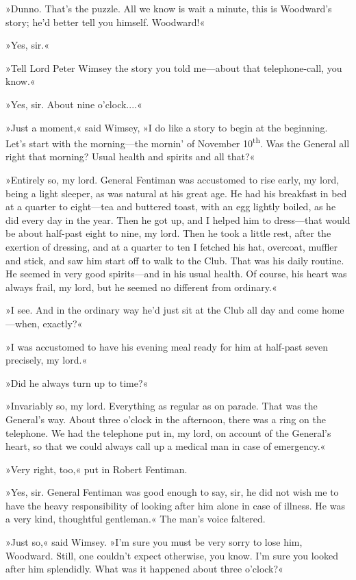 »Dunno. That's the puzzle. All we know is \textellipsis  wait a minute, this is Woodward's story; he'd better tell you himself. Woodward!«

»Yes, sir.«

»Tell Lord Peter Wimsey the story you told me—about that telephone-call, you know.«

»Yes, sir. About nine o'clock....«

»Just a moment,« said Wimsey, »I do like a story to begin at the beginning. Let's start with the morning—the mornin' of November  10\textsuperscript{th}. Was the General all right that morning? Usual health and spirits and all that?«

»Entirely so, my lord. General Fentiman was accustomed to rise early, my lord, being a light sleeper, as was natural at his great age. He had his breakfast in bed at a quarter to eight—tea and buttered toast, with an egg lightly boiled, as he did every day in the year. Then he got up, and I helped him to dress—that would be about half-past eight to nine, my lord. Then he took a little rest, after the exertion of dressing, and at a quarter to ten I fetched his hat, overcoat, muffler and stick, and saw him start off to walk to the Club. That was his daily routine. He seemed in very good spirits—and in his usual health. Of course, his heart was always frail, my lord, but he seemed no different from ordinary.«

»I see. And in the ordinary way he'd just sit at the Club all day and come home—when, exactly?«

»I was accustomed to have his evening meal ready for him at half-past seven precisely, my lord.«

»Did he always turn up to time?«

»Invariably so, my lord. Everything as regular as on parade. That was the General's way. About three o'clock in the afternoon, there was a ring on the telephone. We had the telephone put in, my lord, on account of the General's heart, so that we could always call up a medical man in case of emergency.«

»Very right, too,« put in Robert Fentiman.

»Yes, sir. General Fentiman was good enough to say, sir, he did not wish me to have the heavy responsibility of looking after him alone in case of illness. He was a very kind, thoughtful gentleman.« The man's voice faltered.

»Just so,« said Wimsey. »I'm sure you must be very sorry to lose him, Woodward. Still, one couldn't expect otherwise, you know. I'm sure you looked after him splendidly. What was it happened about three o'clock?«


